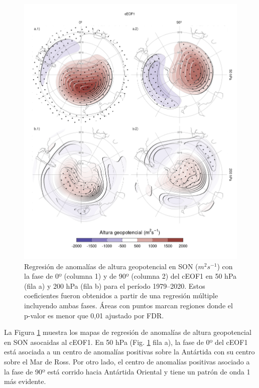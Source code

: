 \documentclass[12pt,oneside,a4paper]{reedthesis}
\begin{document}
\begin{figure}

{\centering \includegraphics{figures/20-ceofs/eof1-regr-gh-1} 

}

\caption{Regresión de anomalías de altura geopotencial en SON (\(m^2s^{-1}\)) con la fase de 0º (columna 1) y de 90º (columna 2) del cEOF1 en 50 hPa (fila a) y 200 hPa (fila b) para el período 1979--2020. Estos coeficientes fueron obtenidos a partir de una regresión múltiple incluyendo ambas fases. Áreas con puntos marcan regiones donde el p-valor es menor que 0,01 ajustado por FDR.}\label{fig:eof1-regr-gh}
\end{figure}

La Figura \ref{fig:eof1-regr-gh} muestra los mapas de regresión de anomalías de altura geopotencial en SON asocaidas al cEOF1.
En 50 hPa (Fig. \ref{fig:eof1-regr-gh} fila a), la fase de 0º del cEOF1 está asociada a un centro de anomalías positivas sobre la Antártida con su centro sobre el Mar de Ross.
Por otro lado, el centro de anomalías positivas asociado a la fase de 90º está corrido hacia Antártida Oriental y tiene un patrón de onda 1 más evidente.
\end{document}
